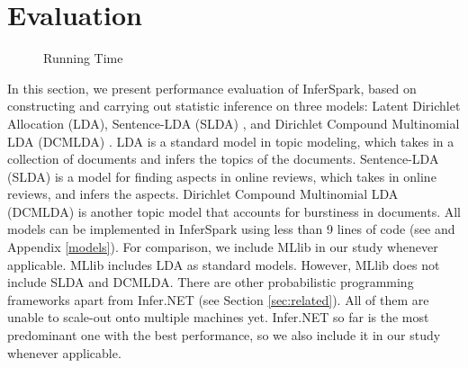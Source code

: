 \section{Evaluation}
\label{sec:eval}

\begin{figure}
\centering
	\caption{Running Time}
    \label{fig:exp_comparison}
\end{figure} 

In this section, we present performance evaluation of InferSpark, based on constructing 
and carrying out statistic inference on three models: Latent Dirichlet Allocation (LDA), Sentence-LDA (SLDA) \cite{Jo2011}, and Dirichlet Compound Multinomial LDA (DCMLDA) \cite{Doyle2009}.
LDA is a standard model in topic modeling, which takes in a collection of documents
and infers the topics of the documents.  
Sentence-LDA (SLDA) is a model for finding aspects in online reviews, which takes in online reviews, and infers the aspects.
Dirichlet Compound Multinomial LDA (DCMLDA) is another topic model that accounts for burstiness in documents.
All models can be implemented in InferSpark using less than 9 lines of code (see  and Appendix \ref{models}).
For comparison, we include MLlib in our study whenever applicable.
MLlib includes LDA as standard models.  However, MLlib does not include SLDA and DCMLDA.
There are other probabilistic programming frameworks apart from Infer.NET (see Section \ref{sec:related}).
All of them are unable to scale-out onto multiple machines yet.  
Infer.NET so far is the most predominant one with the best performance, so we also include it in our study whenever applicable.

